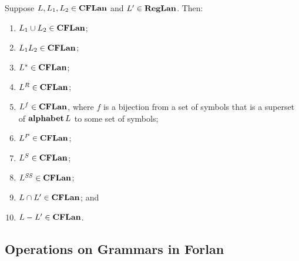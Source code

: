 \begin{theorem}
Suppose $L,L_1,L_2\in\mathbf{CFLan}$ and $L'\in\mathbf{RegLan}$.
Then:
\begin{enumerate}[\quad(1)]
\item $L_1\cup L_2\in\mathbf{CFLan}$;

\item $L_1L_2\in\mathbf{CFLan}$;

\item $L^*\in\mathbf{CFLan}$;

\item $L^R\in\mathbf{CFLan}$;

\item $L^f\in\mathbf{CFLan}$, where $f$ is a bijection from a set of
symbols that is a superset of $\mathbf{alphabet}\,L$ to some
set of symbols;

\item $L^P\in\mathbf{CFLan}$;

\item $L^S\in\mathbf{CFLan}$;

\item $L^{\mathit{SS}}\in\mathbf{CFLan}$;

\item $L\cap L'\in\mathbf{CFLan}$; and

\item $L-L'\in\mathbf{CFLan}$.
\end{enumerate}
\end{theorem}

\subsection{Operations on Grammars in Forlan}

